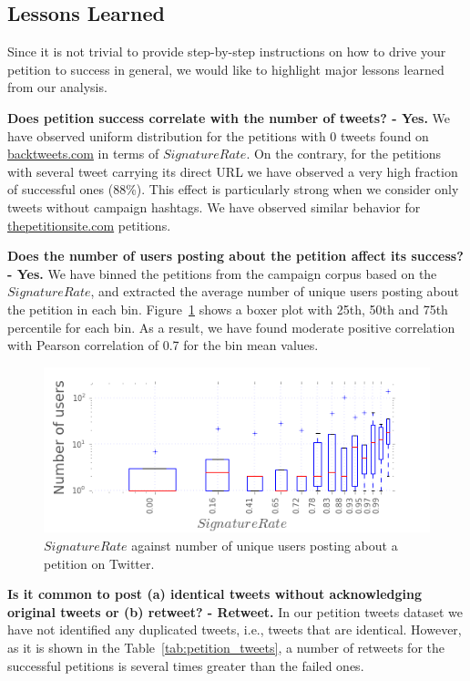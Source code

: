 \subsection{Lessons Learned}
\label{sec:discussion}
Since it is not trivial to provide step-by-step instructions on how to drive your petition to success in general, we would like to highlight major lessons learned from our analysis.

\textbf{Does petition success correlate with the number of tweets? - Yes.} We have observed uniform distribution for the petitions with 0 tweets found on \url{backtweets.com} in terms of $SignatureRate$. On the contrary, for the petitions with several tweet carrying its direct URL we have observed a very high fraction of successful ones (88\%). This effect is particularly strong when we consider only tweets without campaign hashtags. We have observed similar behavior for \url{thepetitionsite.com} petitions.

\textbf{Does the number of users posting about the petition affect its success? - Yes.} We have binned the petitions from the campaign corpus based on the $SignatureRate$, and extracted the average number of unique users posting about the petition in each bin. Figure~\ref{fig:signatures_vs_users} shows a boxer plot with 25th, 50th and 75th percentile for each bin. As a result, we have found moderate positive correlation with Pearson correlation of 0.7 for the bin mean values.

\begin{figure}
\centering
\includegraphics[scale=0.45]{figures/signaturesgoalVSnumusersCampaigns.png}
\caption{$SignatureRate$ against number of unique users posting about a petition on Twitter.}
\label{fig:signatures_vs_users}
\end{figure}

\textbf{Is it common to post (a) identical tweets without acknowledging original tweets or (b) retweet? - Retweet.} In our petition tweets dataset we have not identified any duplicated tweets, i.e., tweets that are identical. However, as it is shown in the Table~\ref{tab:petition_tweets}, a number of retweets for the successful petitions is several times greater than the failed ones.

